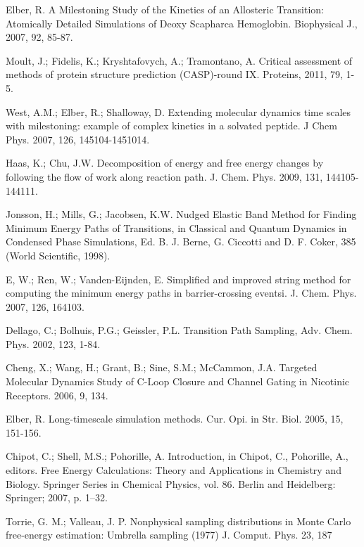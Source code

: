 \documentclass[12pt]{article}
\begin{document}
\begin{thebibliography}{99}

Elber, R. A Milestoning Study of the Kinetics of an Allosteric Transition: Atomically Detailed Simulations of Deoxy Scapharca
Hemoglobin. Biophysical J., 2007, 92, 85-87.

Moult, J.; Fidelis, K.; Kryshtafovych, A.; Tramontano, A. Critical assessment of methods of protein structure prediction (CASP)-round IX.
Proteins, 2011, 79, 1-5.

West, A.M.; Elber, R.; Shalloway, D. Extending molecular dynamics time scales with milestoning: example of complex kinetics
in a solvated peptide. J Chem Phys. 2007, 126, 145104-1451014.

Haas, K.; Chu, J.W. Decomposition of energy and free energy changes by following the flow of work along reaction path.
J. Chem. Phys. 2009, 131, 144105-144111.

Jonsson, H.; Mills, G.; Jacobsen, K.W. Nudged Elastic Band Method for Finding Minimum Energy Paths of Transitions,
in Classical and Quantum Dynamics in Condensed Phase Simulations, Ed. B. J. Berne, G. Ciccotti and D. F.
Coker, 385 (World Scientific, 1998).

E, W.; Ren, W.; Vanden-Eijnden, E. Simplified and improved string method for computing the minimum energy paths in
barrier-crossing eventsi. J. Chem. Phys. 2007, 126, 164103.

Dellago, C.; Bolhuis, P.G.; Geissler, P.L. Transition Path Sampling, Adv. Chem. Phys. 2002, 123, 1-84.

Cheng, X.; Wang, H.; Grant, B.; Sine, S.M.; McCammon, J.A. Targeted Molecular Dynamics Study of C-Loop Closure
and Channel Gating in Nicotinic Receptors. 2006, 9, 134.

Elber, R. Long-timescale simulation methods. Cur. Opi. in Str. Biol. 2005, 15, 151-156.

Chipot, C.; Shell, M.S.; Pohorille, A. Introduction, in Chipot, C., Pohorille, A., editors. Free Energy
Calculations: Theory and Applications in Chemistry and Biology. Springer Series in Chemical
Physics, vol. 86. Berlin and Heidelberg: Springer; 2007, p. 1–32.

Torrie, G. M.; Valleau, J. P. Nonphysical sampling distributions in Monte Carlo free-energy estimation: Umbrella sampling
(1977) J. Comput. Phys. 23, 187


\end{thebibliography}
\end{document}
